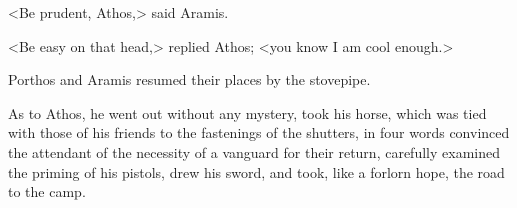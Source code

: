 <Be prudent, Athos,> said Aramis. 

<Be easy on that head,> replied Athos; <you know I am cool enough.> 

Porthos and Aramis resumed their places by the stovepipe. 

As to Athos, he went out without any mystery, took his horse, which was tied with those of his friends to the fastenings of the shutters, in four words convinced the attendant of the necessity of a vanguard for their return, carefully examined the priming of his pistols, drew his sword, and took, like a forlorn hope, the road to the camp. 